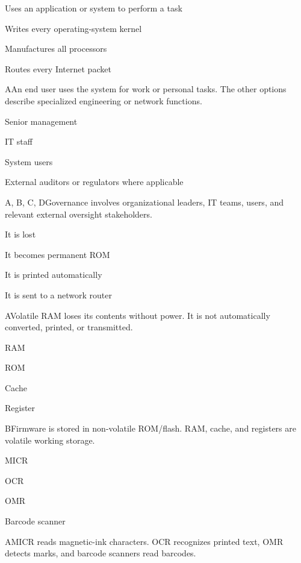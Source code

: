 \begin{enumerate}[label=\textbf{Q\arabic*.}, leftmargin=*]
  {\item Uses an application or system to perform a task
   \item Writes every operating-system kernel
   \item Manufactures all processors
   \item Routes every Internet packet}
  {A}{An end user uses the system for work or personal tasks. The other options describe specialized engineering or network functions.}
  {\item Senior management
   \item IT staff
   \item System users
   \item External auditors or regulators where applicable}
  {A, B, C, D}{Governance involves organizational leaders, IT teams, users, and relevant external oversight stakeholders.}
\fi
\ifnum{}
  {\item It is lost
   \item It becomes permanent ROM
   \item It is printed automatically
   \item It is sent to a network router}
  {A}{Volatile RAM loses its contents without power. It is not automatically converted, printed, or transmitted.}
  {\item RAM
   \item ROM
   \item Cache
   \item Register}
  {B}{Firmware is stored in non-volatile ROM/flash. RAM, cache, and registers are volatile working storage.}
  {\item MICR
   \item OCR
   \item OMR
   \item Barcode scanner}
  {A}{MICR reads magnetic-ink characters. OCR recognizes printed text, OMR detects marks, and barcode scanners read barcodes.}

\end{enumerate}
